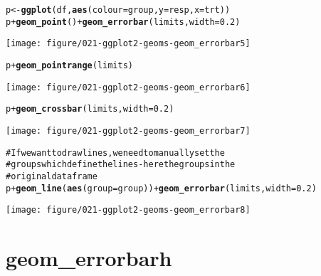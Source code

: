 \documentclass[a4paper,titlepage]{tufte-handout}\usepackage{graphicx, color}
\makeatletter
\def\maxwidth{ %
  \ifdim\Gin@nat@width>\linewidth
    \linewidth
  \else
    \Gin@nat@width
  \fi
}
\newcommand{\hlfunctioncall}[1]{\textcolor[rgb]{0.501960784313725,0,0.329411764705882}{\textbf{#1}}}%
\newcommand{\hlcomment}[1]{\textcolor[rgb]{0.180392156862745,0.6,0.341176470588235}{#1}}%
\newenvironment{kframe}{%
 \def\at@end@of@kframe{}%
 \ifinner\ifhmode%
  \def\at@end@of@kframe{\end{minipage}}%
  \begin{minipage}{\columnwidth}%
 \fi\fi%
 \def\FrameCommand##1{\hskip\@totalleftmargin \hskip-\fboxsep
 \colorbox{shadecolor}{##1}\hskip-\fboxsep
     \hskip-\linewidth \hskip-\@totalleftmargin \hskip\columnwidth}%
 \MakeFramed {\advance\hsize-\width
   \@totalleftmargin\z@ \linewidth\hsize
   \@setminipage}}%
 {\par\unskip\endMakeFramed%
 \at@end@of@kframe}
\newenvironment{knitrout}{}{} %
\makeatother
\begin{document}
\begin{knitrout}
\begin{kframe}
\begin{alltt}
p <- \hlfunctioncall{ggplot}(df, \hlfunctioncall{aes}(colour=group, y=resp, x=trt))
p + \hlfunctioncall{geom_point}() + \hlfunctioncall{geom_errorbar}(limits, width=0.2)
\end{alltt}
\end{kframe}\texttt{[image: figure/021-ggplot2-geoms-geom\_errorbar5]} \begin{kframe}\begin{alltt}
p + \hlfunctioncall{geom_pointrange}(limits)
\end{alltt}
\end{kframe}\texttt{[image: figure/021-ggplot2-geoms-geom\_errorbar6]} \begin{kframe}\begin{alltt}
p + \hlfunctioncall{geom_crossbar}(limits, width=0.2)
\end{alltt}
\end{kframe}\texttt{[image: figure/021-ggplot2-geoms-geom\_errorbar7]} \begin{kframe}\begin{alltt}
\hlcomment{# If we want to draw lines, we need to manually set the}
\hlcomment{# groups which define the lines - here the groups in the}
\hlcomment{# original dataframe}
p + \hlfunctioncall{geom_line}(\hlfunctioncall{aes}(group=group)) + \hlfunctioncall{geom_errorbar}(limits, width=0.2)
\end{alltt}
\end{kframe}\texttt{[image: figure/021-ggplot2-geoms-geom\_errorbar8]} 
\end{knitrout}


\section{geom\_errorbarh}
\end{document}
